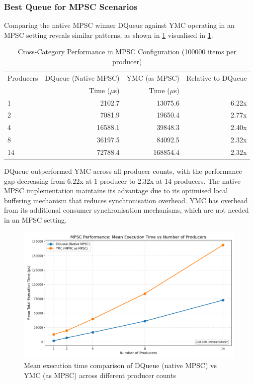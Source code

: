 \subsubsection{Best Queue for \ac{MPSC} Scenarios}
Comparing the native \ac{MPSC} winner DQueue against \ac{YMC} operating in an \ac{MPSC} setting reveals similar patterns, as shown in \cref{tab:best-mpsc} visualised in \cref{fig:cross-mpsc-mean}.

\begin{table}[htb]
\centering
\caption{Cross-Category Performance in \ac{MPSC} Configuration (100000 items per producer)}
\label{tab:best-mpsc}
\begin{tabular}{@{}lrrr@{}}
\toprule
Producers & DQueue (Native \ac{MPSC}) & \ac{YMC} (as \ac{MPSC}) & Relative to DQueue \\
& Time ($\mu$s) & Time ($\mu$s) & \\
\midrule
1 & 2102.7 & 13075.6 & 6.22x \\
2 & 7081.9 & 19650.4 & 2.77x \\
4 & 16588.1 & 39848.3 & 2.40x \\
8 & 36197.5 & 84092.5 & 2.32x \\
14 & 72788.4 & 168854.4 & 2.32x \\
\bottomrule
\end{tabular}
\end{table}

DQueue outperformed \ac{YMC} across all producer counts, with the performance gap decreasing from 6.22x at 1 producer to 2.32x at 14 producers. The native \ac{MPSC} implementation maintains its advantage due to its optimised local buffering mechanism that reduces synchronisation overhead. \ac{YMC} has overhead from its additional consumer synchronisation mechanisms, which are not needed in an \ac{MPSC} setting.

\begin{figure}[htb]
\centering
\caption{Mean execution time comparison of DQueue (native MPSC) vs YMC (as MPSC) across different producer counts}
\label{fig:cross-mpsc-mean}
\includegraphics[width=\textwidth]{images/results/best_in_mpsc_mean_performance_vs_producers.png}
\end{figure}

